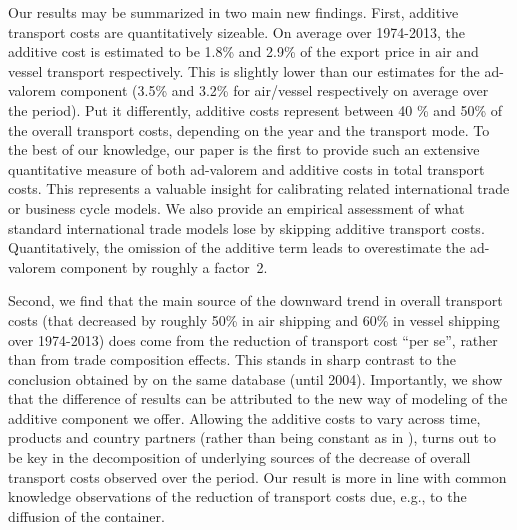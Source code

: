 \documentclass[a4paper,11pt]{article}
\begin{document}
Our results may be summarized in two main new findings. First, additive transport costs are quantitatively sizeable. On average over 1974-2013, the additive cost is estimated to be 1.8\% and 2.9\% of the export price in air and vessel transport respectively. This is slightly lower than our estimates for the ad-valorem component (3.5\% and 3.2\% for air/vessel respectively on average over the period). Put it differently, additive costs represent between 40 \% and 50\% of the overall transport costs, depending on the year and the transport mode. To the best of our knowledge, our paper is the first to provide such an extensive quantitative measure of both ad-valorem and additive costs in total transport costs. This represents a valuable insight for calibrating related international trade or business cycle models. We also provide an empirical assessment of what standard international trade models lose by skipping additive transport costs. Quantitatively, the omission of the additive term leads to overestimate the ad-valorem component by roughly a factor~2. 

Second, we find that the main source of the downward trend in overall transport costs (that decreased by roughly 50\% in air shipping and 60\% in vessel shipping over 1974-2013) does come from the reduction of transport cost ``per se'', rather than from trade composition effects. This stands in sharp contrast to the conclusion obtained by \cite{hummels2007} on the same database (until 2004). Importantly, we show that the difference of results can be attributed to the new way of modeling of the additive component we offer. Allowing the additive costs to vary  across time, products and country partners (rather than being constant as in \citealp{hummels2007}), turns out to be key in the decomposition of underlying sources of the decrease of overall transport costs observed over the period. Our result is more in line with common knowledge observations of the reduction of transport costs due, e.g., to the diffusion of the container.\smallskip
\end{document}
